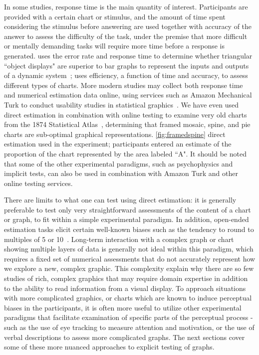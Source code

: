 \documentclass[letterpaper]{ar-1col}\usepackage[]{graphicx}\usepackage[]{color}
\begin{document}
In some studies, response time is the main quantity of interest. Participants are provided with a certain chart or stimulus, and the amount of time spent considering the stimulus before answering  are used together with accuracy of the answer to assess the difficulty of the task, under the premise that more difficult or mentally demanding tasks will require more time before a response is generated. \citet{carswellInformationIntegrationObject1987} uses the error rate and response time to determine whether triangular ``object displays" are superior to bar graphs to represent the inputs and outputs of a dynamic system~\citep[see Fig.2 in][for an example of an object display]{carswellInformationIntegrationObject1987}; \citet{leggeEfficiencyGraphicalPerception1989} uses efficiency, a function of time and accuracy, to assess different types of charts. More modern studies may collect both response time and numerical estimation data online, using services such as Amazon Mechanical Turk to conduct usability studies in statistical graphics~\citep{heer2010crowdsourcing}. We have even used direct estimation in combination with online testing to examine very old charts from the 1874 Statistical Atlas~\citep{vanderplasFramedReproducingRevisiting2019}, determining that framed mosaic, spine, and pie charts are sub-optimal graphical representations. \autoref{fig:framedspine} direct estimation used in the experiment; participants entered an estimate of the proportion of the chart represented by the area labeled ``A". It should be noted that some of the other experimental paradigms, such as psychophysics and implicit tests, can also be used in combination with Amazon Turk and other online testing services.

There are limits to what one can test using direct estimation: it is generally preferable to test only very straightforward assessments of the content of a chart or graph, to fit within a simple experimental paradigm. In addition, open-ended estimation tasks elicit certain well-known biases such as the tendency to round to multiples of 5 or 10~\citep{bairdRelativeFrequenciesNumerical1970}. Long-term interaction with a complex graph or chart showing multiple layers of data is generally not ideal within this paradigm, which requires a fixed set of numerical assessments that do not accurately represent how we explore a new, complex graphic. This complexity explain why there are so few studies of rich, complex graphics that may require domain expertise in addition to the ability to read information from a visual display. To approach situations with more complicated graphics, or charts which are known to induce perceptual biases in the participants, it is often more useful to utilize other experimental paradigms that facilitate examination of specific parts of the perceptual process - such as the use of eye tracking to measure attention and motivation, or the use of verbal descriptions to assess more complicated graphs. The next sections cover some of these more nuanced approaches to explicit testing of graphs.
\end{document}
